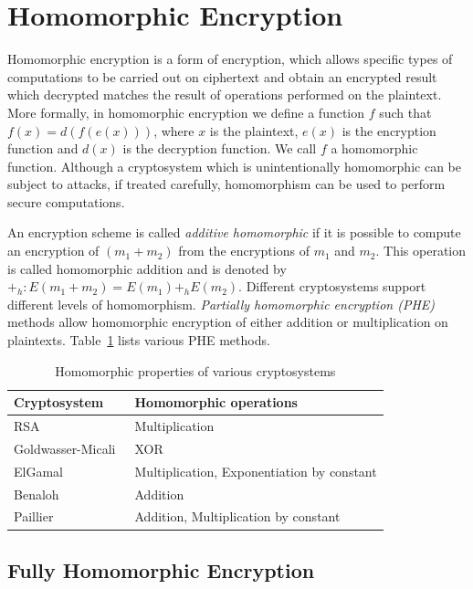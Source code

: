 \documentclass[11pt]{article}
\theoremstyle{plain}
\begin{document}
\section{Homomorphic Encryption}

Homomorphic encryption is a form of encryption, which allows specific
types of computations to be carried out on ciphertext and obtain an
encrypted result which decrypted matches the result of operations
performed on the plaintext. More formally, in homomorphic encryption
we define a function $f$ such that $f(x)=d(f(e(x)))$, where $x$
is the plaintext, $e(x)$ is the encryption function and $d(x)$ is
the decryption function. We call $f$ a homomorphic function. Although
a cryptosystem which is unintentionally homomorphic can be subject
to attacks, if treated carefully, homomorphism can be used to perform
secure computations.

An encryption scheme is called \emph{additive homomorphic} if it is
possible to compute an encryption of $(m_{1}+m_{2})$ from the encryptions
of $m_{1}$ and $m_{2}$. This operation is called homomorphic addition
and is denoted by $+_{h}:E(m_{1}+m_{2})=E(m_{1})+_{h}E(m_{2})$. Different
cryptosystems support different levels of homomorphism. \textit{Partially
	homomorphic encryption (PHE)} methods allow homomorphic encryption
of either addition or multiplication on plaintexts. Table~\ref{tab:partial-he}
lists various PHE methods.

\begin{table}[H]
	\caption{Homomorphic properties of various cryptosystems}
	\label{tab:partial-he}
	\centering{}\vspace{7pt}
	\begin{tabular}{l|l}
		\hline 
		\textbf{Cryptosystem } & \textbf{Homomorphic operations }\tabularnewline
		\hline 
		RSA~\cite{Rivest:1978:MOD:359340.359342}  & Multiplication\tabularnewline
		Goldwasser-Micali~\cite{Goldwasser:1982:PEA:800070.802212}  & XOR \tabularnewline
		ElGamal~\cite{ElGamal:1985:PKC:19478.19480}  & Multiplication, Exponentiation by constant\tabularnewline
		Benaloh~\cite{Benaloh94denseprobabilistic}  & Addition \tabularnewline
		Paillier~\cite{Paillier:1999:PCB:1756123.1756146}  & Addition, Multiplication by constant \tabularnewline
		\hline 
	\end{tabular} 
\end{table}


\subsection{Fully Homomorphic Encryption}
\end{document}
